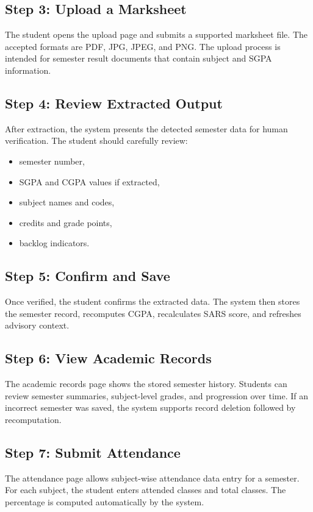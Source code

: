 \subsection{Step 3: Upload a Marksheet}
The student opens the upload page and submits a supported marksheet file. The accepted formats are PDF, JPG, JPEG, and PNG. The upload process is intended for semester result documents that contain subject and SGPA information.

\subsection{Step 4: Review Extracted Output}
After extraction, the system presents the detected semester data for human verification. The student should carefully review:
\begin{itemize}[leftmargin=*]
\item semester number,
\item SGPA and CGPA values if extracted,
\item subject names and codes,
\item credits and grade points,
\item backlog indicators.
\end{itemize}

\subsection{Step 5: Confirm and Save}
Once verified, the student confirms the extracted data. The system then stores the semester record, recomputes CGPA, recalculates SARS score, and refreshes advisory context.

\subsection{Step 6: View Academic Records}
The academic records page shows the stored semester history. Students can review semester summaries, subject-level grades, and progression over time. If an incorrect semester was saved, the system supports record deletion followed by recomputation.

\subsection{Step 7: Submit Attendance}
The attendance page allows subject-wise attendance data entry for a semester. For each subject, the student enters attended classes and total classes. The percentage is computed automatically by the system.

